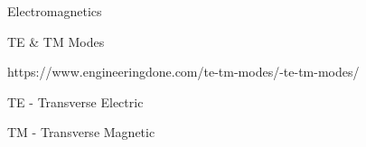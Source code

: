 Electromagnetics

TE & TM Modes

https://www.engineeringdone.com/te-tm-modes/-te-tm-modes/

TE - Transverse Electric

TM - Transverse Magnetic